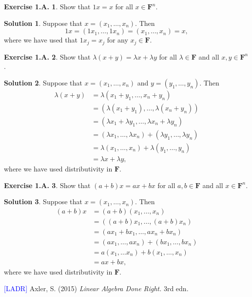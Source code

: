 \documentclass[12pt]{article}
\theoremstyle{definition}
\theoremstyle{exercise}
\newtheorem{exercise}{Exercise 1.A.}
\theoremstyle{solution}
\newtheorem*{solution}{Solution}
\newcommand{\F}{\mathbf{F}}
\begin{document}
\begin{exercise}
\label{ex:14}
    Show that \( 1x = x \) for all \( x \in \F^n \).
\end{exercise}

\begin{solution}
    Suppose that \( x = (x_1, \ldots, x_n) \). Then
    \[
        1x = (1 x_1, \ldots, 1 x_n) = (x_1, \ldots, x_n) = x,
    \]
    where we have used that \( 1 x_j = x_j \) for any \( x_j \in \F \).
\end{solution}

\begin{exercise}
\label{ex:15}
    Show that \( \lambda (x + y) = \lambda x + \lambda y \) for all \( \lambda \in \F \) and all \( x, y \in \F^n \).
\end{exercise}

\begin{solution}
    Suppose that \( x = (x_1, \ldots, x_n) \) and \( y = (y_1, \ldots, y_n) \). Then
    \begin{align*}
        \lambda (x + y) &= \lambda (x_1 + y_1, \ldots, x_n + y_n) \\
        &= (\lambda (x_1 + y_1), \ldots, \lambda (x_n + y_n)) \\
        &= (\lambda x_1 + \lambda y_1, \ldots, \lambda x_n + \lambda y_n) \\
        &= (\lambda x_1, \ldots, \lambda x_n) + (\lambda y_1, \ldots, \lambda y_n) \\
        &= \lambda (x_1, \ldots, x_n) + \lambda (y_1, \ldots, y_n) \\
        &= \lambda x + \lambda y,
    \end{align*}
    where we have used distributivity in \( \F \).
\end{solution}

\begin{exercise}
\label{ex:16}
    Show that \( (a + b)x = ax + bx \) for all \( a, b \in \F \) and all \( x \in \F^n \).
\end{exercise}

\begin{solution}
    Suppose that \( x = (x_1, \ldots, x_n) \). Then
    \begin{align*}
        (a + b) x &= (a + b) (x_1, \ldots, x_n) \\
        &= ((a + b) x_1, \ldots, (a + b) x_n) \\
        &= (a x_1 + b x_1, \ldots, a x_n + b x_n) \\
        &= (a x_1, \ldots, a x_n) + (b x_1, \ldots, b x_n) \\
        &= a (x_1, \ldots x_n) + b (x_1, \ldots, x_n) \\
        &= ax + bx,
    \end{align*}
    where we have used distributivity in \( \F \).
\end{solution}

\noindent \hrulefill

\noindent \hypertarget{ladr}{\textcolor{blue}{[LADR]} Axler, S. (2015) \textit{Linear Algebra Done Right.} 3rd edn.}
\end{document}
